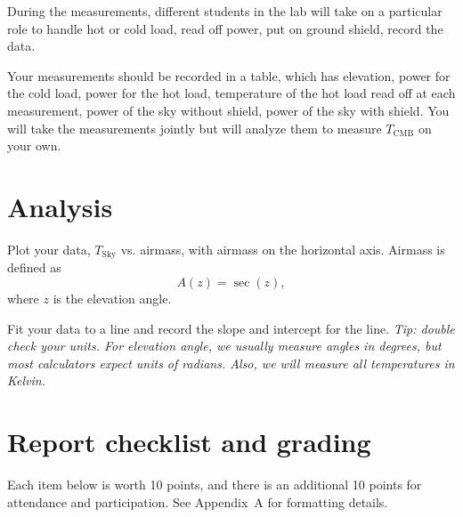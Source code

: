 During the measurements, different students in the lab will take on a particular role to handle hot or cold load, read off power, put on ground shield, record the data.
\begin{steps}
	\item\label{cmb:step:table} Your measurements should be recorded in a table, which has elevation, power for the cold load, power for the hot load, temperature of the hot load read off at each measurement, power of the sky without shield, power of the sky with shield. You will take the measurements jointly but will analyze them to measure $T_\textrm{CMB}$ on your own.
\end{steps}



\section{Analysis}

\begin{steps}
	\item\label{cmb:step:plot} Plot your data, $T_\textrm{Sky}$ vs. airmass, with airmass on the horizontal axis. Airmass is defined as
	\begin{equation}
	 A(z) = \sec(z),
	\end{equation}
	where $z$ is the elevation angle.
	
	\item\label{cmb:step:fit} Fit your data to a line and record the slope and intercept for the line. \textit{Tip: double check your units. For elevation angle, we usually measure angles in degrees, but most calculators expect units of radians. Also, we will measure all temperatures in Kelvin.}
\end{steps}

\section{Report checklist and grading}

Each item below is worth 10 points, and there is an additional 10 points for attendance and participation. See Appendix~A for formatting details.

